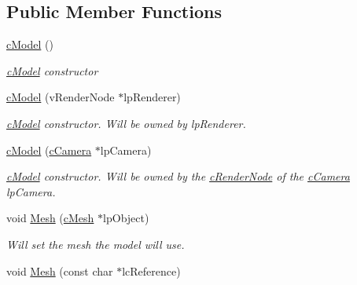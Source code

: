 \subsection*{Public Member Functions}
\begin{DoxyCompactItemize}
\item 
\hypertarget{classc_model_a0bf26e188e4bd04e603d00bd2fb48328}{
\hyperlink{classc_model_a0bf26e188e4bd04e603d00bd2fb48328}{cModel} ()}
\label{classc_model_a0bf26e188e4bd04e603d00bd2fb48328}

\begin{DoxyCompactList}\small\item\em \hyperlink{classc_model}{cModel} constructor \end{DoxyCompactList}\item 
\hypertarget{classc_model_a6433402464a1ec4c851e3e4f868d1c6e}{
\hyperlink{classc_model_a6433402464a1ec4c851e3e4f868d1c6e}{cModel} (vRenderNode $\ast$lpRenderer)}
\label{classc_model_a6433402464a1ec4c851e3e4f868d1c6e}

\begin{DoxyCompactList}\small\item\em \hyperlink{classc_model}{cModel} constructor. Will be owned by lpRenderer. \end{DoxyCompactList}\item 
\hypertarget{classc_model_af51858daa3cfe79b70548ba01f0ed6fd}{
\hyperlink{classc_model_af51858daa3cfe79b70548ba01f0ed6fd}{cModel} (\hyperlink{classc_camera}{cCamera} $\ast$lpCamera)}
\label{classc_model_af51858daa3cfe79b70548ba01f0ed6fd}

\begin{DoxyCompactList}\small\item\em \hyperlink{classc_model}{cModel} constructor. Will be owned by the \hyperlink{classc_render_node}{cRenderNode} of the \hyperlink{classc_camera}{cCamera} lpCamera. \end{DoxyCompactList}\item 
\hypertarget{classc_model_aaf5401048d8b857d276ca4821a975009}{
void \hyperlink{classc_model_aaf5401048d8b857d276ca4821a975009}{Mesh} (\hyperlink{classc_mesh}{cMesh} $\ast$lpObject)}
\label{classc_model_aaf5401048d8b857d276ca4821a975009}

\begin{DoxyCompactList}\small\item\em Will set the mesh the model will use. \end{DoxyCompactList}\item 
\hypertarget{classc_model_a2d18b2dd60d8ed6473d782d747662116}{
void \hyperlink{classc_model_a2d18b2dd60d8ed6473d782d747662116}{Mesh} (const char $\ast$lcReference)}
\label{classc_model_a2d18b2dd60d8ed6473d782d747662116}


\end{DoxyCompactItemize}

